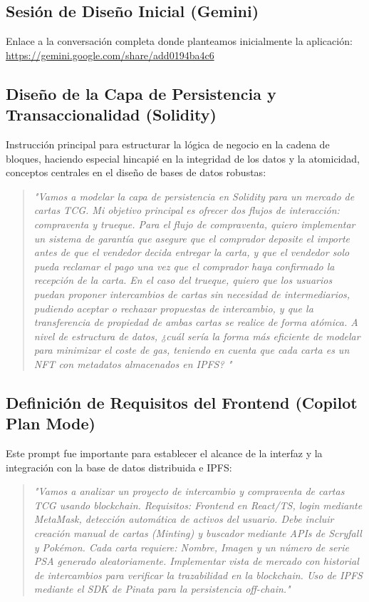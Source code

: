 \subsection{Sesión de Diseño Inicial (Gemini)}
Enlace a la conversación completa donde planteamos inicialmente la aplicación: \\ \url{https://gemini.google.com/share/add0194ba4c6}

\subsection{Diseño de la Capa de Persistencia y Transaccionalidad (Solidity)}
Instrucción principal para estructurar la lógica de negocio en la cadena de bloques, 
haciendo especial hincapié en la integridad de los datos y la atomicidad, conceptos centrales 
en el diseño de bases de datos robustas:

\begin{quote}
    \textit{"Vamos a modelar la capa de persistencia en Solidity para un mercado de cartas TCG. 
	Mi objetivo principal es ofrecer dos flujos de interacción: compraventa y trueque. Para el flujo de compraventa,
	quiero implementar un sistema de garantía que asegure que el comprador deposite el importe antes de que el vendedor
	decida entregar la carta, y que el vendedor solo pueda reclamar el pago una vez que el comprador haya confirmado la recepción de la carta. 
	En el caso del trueque, quiero que los usuarios puedan proponer intercambios de cartas sin necesidad de intermediarios,
	pudiendo aceptar o rechazar propuestas de intercambio, y que la transferencia de propiedad de ambas cartas se realice de forma atómica.
	A nivel de estructura de 
	datos, ¿cuál sería la forma más eficiente de modelar para minimizar el coste de gas, teniendo en cuenta que cada carta es un NFT con metadatos almacenados en IPFS?	"}
\end{quote}

\subsection{Definición de Requisitos del Frontend (Copilot Plan Mode)}

Este prompt fue importante para establecer el alcance de la interfaz y la integración con la base de datos distribuida e IPFS:

\begin{quote}
	\textit{"Vamos a analizar un proyecto de intercambio y compraventa de cartas TCG usando blockchain. 
	Requisitos: Frontend en React/TS, login mediante MetaMask, detección automática de activos del usuario. 
	Debe incluir creación manual de cartas (Minting) y buscador mediante APIs de Scryfall y Pokémon. 
	Cada carta requiere: Nombre, Imagen y un número de serie PSA generado aleatoriamente. Implementar 
	vista de mercado con historial de intercambios para verificar la trazabilidad en la blockchain. Uso 
	de IPFS mediante el SDK de Pinata para la persistencia off-chain."}
\end{quote}

